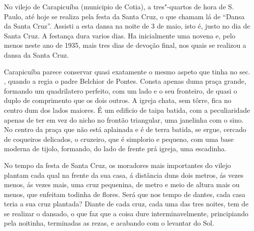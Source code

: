 No vilejo de Carapicuíba (municipio de Cotia), a tres"-quartos de hora de
S. Paulo, até hoje se realiza pela festa da Santa Cruz, o que chamam lá
de ``Dansa da Santa Cruz''. Assisti a esta dansa na noite de 3 de maio,
isto é, justo no dia de Santa Cruz. A festança dura varios dias. Ha
inicialmente uma novena e, pelo menos neste ano de 1935, mais tres dias
de devoção final, nos quais se realizou a dansa da Santa Cruz.

Carapicuíba parece conservar quasi exatamente o mesmo aspeto que tinha
no sec. , quando a regia o padre Belchior de Pontes. Consta apenas
duma praça grande, formando um quadrilatero perfeito, com um lado e o
seu fronteiro, de quasi o duplo de comprimento que os dois outros. A
igreja chata, sem tôrre, fica no centro dum dos lados maiores. É um
edificio de taipa batida, com a peculiaridade apenas de ter em vez do
nicho no frontão triangular, uma janelinha com o sino. No centro da
praça que não está aplainada e é de terra batida, se ergue, cercado de
coqueiros delicados, o cruzeiro, que é simplorio e pequeno, com uma base
moderna de tijolo, formando, do lado de frente prá igreja, uma
escadinha.

No tempo da festa de Santa Cruz, os moradores mais importantes do vilejo
plantam cada qual na frente da sua casa, á distância duns dois metros,
ás vezes menos, ás vezes mais, uma cruz pequenina, de metro e meio de
altura mais ou menos, que enfeitam todinha de flores. Será que nos tempo
de dantes, cada casa teria a sua cruz plantada? Diante de cada cruz,
cada uma das tres noites, tem de se realizar o dansado, o que faz que a
coisa dure interminavelmente, principiando pela noitinha, terminadas as
rezas, e acabando com o levantar do Sol.

